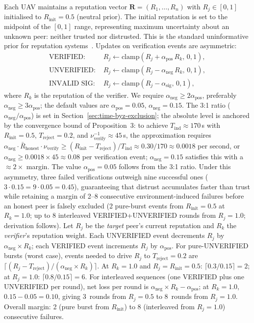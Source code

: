 \documentclass[conference,10pt]{IEEEtran}
\begin{document}
Each UAV maintains a reputation vector $\mathbf{R} = (R_1,\dots,R_n)$ with $R_j \in [0,1]$ initialised to $R_\text{init} = 0.5$ (neutral prior). The initial reputation is set to the midpoint of the $[0,1]$ range, representing maximum uncertainty about an unknown peer: neither trusted nor distrusted. This is the standard uninformative prior for reputation systems~\cite{josang2007survey}. Updates on verification events are asymmetric:
\begin{align}
\text{VERIFIED: }& R_j \leftarrow \mathrm{clamp}(R_j + \alpha_\text{pos}\, R_k,\, 0, 1), \\
\text{UNVERIFIED: }& R_j \leftarrow \mathrm{clamp}(R_j - \alpha_\text{neg}\, R_k,\, 0, 1), \\
\text{INVALID SIG: }& R_j \leftarrow \mathrm{clamp}(R_j - \alpha_\text{sig},\, 0, 1),
\end{align}
where $R_k$ is the reputation of the verifier. We require $\alpha_\text{neg} \geq 2\alpha_\text{pos}$, preferably $\alpha_\text{neg} \geq 3\alpha_\text{pos}$; the default values are $\alpha_\text{pos} = 0.05$, $\alpha_\text{neg} = 0.15$. The 3:1 ratio ($\alpha_\text{neg}/\alpha_\text{pos}$) is set in Section~\ref{sec:time-byz-exclusion}; the absolute level is anchored by the convergence bound of Proposition~3: to achieve $T_\text{ind} \approx 170$\,s with $R_\text{init}=0.5$, $T_\text{reject}=0.2$, and $\nu_\text{verify}^{-1}\approx45$\,s, the approximation requires $\alpha_\text{neg} \cdot \bar{R}_\text{honest} \cdot \nu_\text{verify} \geq (R_\text{init}-T_\text{reject})/T_\text{ind} \approx 0.30/170 \approx 0.0018$ per second, or $\alpha_\text{neg} \geq 0.0018 \times 45 \approx 0.08$ per verification event; $\alpha_\text{neg}=0.15$ satisfies this with a $\approx 2\times$ margin. The value $\alpha_\text{pos}=0.05$ follows from the 3:1 ratio. Under this asymmetry, three failed verifications outweigh nine successful ones ($3\cdot 0.15 = 9\cdot 0.05 = 0.45$), guaranteeing that distrust accumulates faster than trust while retaining a margin of 2--8 consecutive environment-induced failures before an honest peer is falsely excluded (2 pure-burst events from $R_\text{init}=0.5$ at $R_k=1.0$; up to 8 interleaved VERIFIED+UNVERIFIED rounds from $R_j=1.0$; derivation follows). Let $R_j$ be the \emph{target} peer's current reputation and $R_k$ the \emph{verifier}'s reputation weight. Each UNVERIFIED event decrements $R_j$ by $\alpha_\text{neg} \times R_k$; each VERIFIED event increments $R_j$ by $\alpha_\text{pos}$. For pure-UNVERIFIED bursts (worst case), events needed to drive $R_j$ to $T_\text{reject}=0.2$ are $\lceil(R_j - T_\text{reject})/(\alpha_\text{neg}\times R_k)\rceil$. At $R_k=1.0$ and $R_j=R_\text{init}=0.5$: $\lceil 0.3/0.15\rceil=2$; at $R_j=1.0$: $\lceil 0.8/0.15\rceil=6$. For interleaved sequences (one VERIFIED plus one UNVERIFIED per round), net loss per round is $\alpha_\text{neg}\times R_k - \alpha_\text{pos}$; at $R_k=1.0$, $0.15-0.05=0.10$, giving 3~rounds from $R_j=0.5$ to 8~rounds from $R_j=1.0$. Overall margin: 2 (pure burst from $R_\text{init}$) to 8 (interleaved from $R_j=1.0$) consecutive failures.
\end{document}
